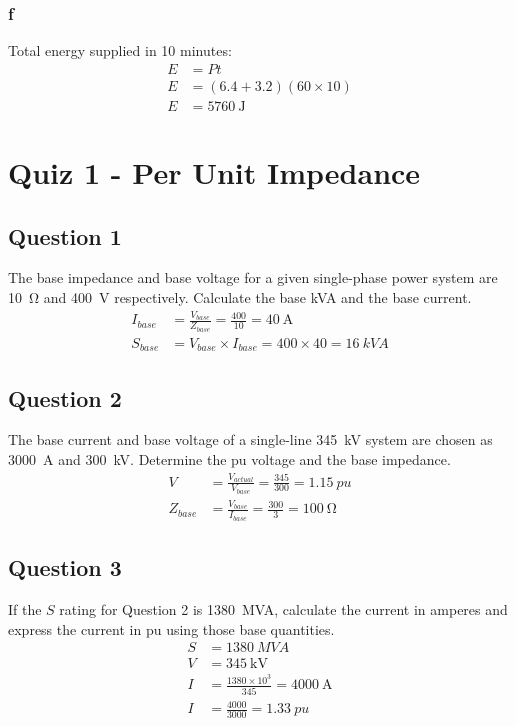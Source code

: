 \subsection{f}
Total energy supplied in 10 minutes:
\begin{align}
    E &= Pt\\
    E &= \left(6.4+3.2\right)\left(60\times 10\right)\\
    E &= \SI{5760}{\joule}
\end{align}
\chapter{Quiz 1 - Per Unit Impedance}
\section{Question 1}
The base impedance and base voltage for a given single-phase power system are \SI{10}{\ohm} and \SI{400}{\volt} respectively. Calculate the base kVA and the base current.
\begin{align}
    I_{base} &= \frac{V_{base}}{Z_{base}} = \frac{400}{10} = \SI{40}{\ampere}\\
    S_{base} &= V_{base}\times I_{base} = 400\times 40 = \SI{16}{kVA}
\end{align}
\section{Question 2}
The base current and base voltage of a single-line \SI{345}{\kilo\volt} system are chosen as \SI{3000}{\ampere} and \SI{300}{\kilo\volt}. Determine the pu voltage and the base impedance.
\begin{align}
    V &= \frac{V_{actual}}{V_{base}} = \frac{345}{300} = \SI{1.15}{pu}\\
    Z_{base} &= \frac{V_{base}}{I_{base}} = \frac{300}{3} = \SI{100}{\ohm}
\end{align}
\section{Question 3}
If the $S$ rating for Question 2 is \SI{1380}{MVA}, calculate the current in amperes and express the current in pu using those base quantities.
\begin{align}
    S &= \SI{1380}{MVA}\\
    V &= \SI{345}{\kilo\volt}\\
    I &= \frac{1380\times 10^3}{345} = \SI{4000}{\ampere}\\
    I &= \frac{4000}{3000} = \SI{1.33}{pu}
\end{align}
